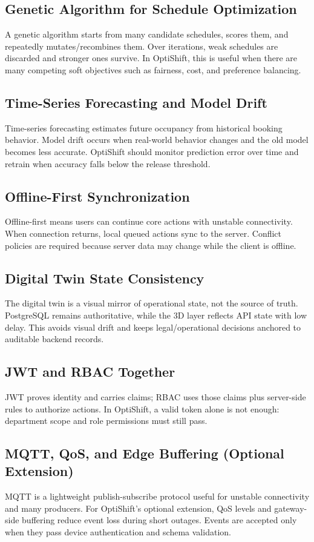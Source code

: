 \documentclass[11pt,a4paper]{article}
\begin{document}
\subsection{Genetic Algorithm for Schedule Optimization}
A genetic algorithm starts from many candidate schedules, scores them, and repeatedly mutates/recombines them.
Over iterations, weak schedules are discarded and stronger ones survive.
In OptiShift, this is useful when there are many competing soft objectives such as fairness, cost, and preference balancing.

\subsection{Time-Series Forecasting and Model Drift}
Time-series forecasting estimates future occupancy from historical booking behavior.
Model drift occurs when real-world behavior changes and the old model becomes less accurate.
OptiShift should monitor prediction error over time and retrain when accuracy falls below the release threshold.

\subsection{Offline-First Synchronization}
Offline-first means users can continue core actions with unstable connectivity.
When connection returns, local queued actions sync to the server.
Conflict policies are required because server data may change while the client is offline.

\subsection{Digital Twin State Consistency}
The digital twin is a visual mirror of operational state, not the source of truth.
PostgreSQL remains authoritative, while the 3D layer reflects API state with low delay.
This avoids visual drift and keeps legal/operational decisions anchored to auditable backend records.

\subsection{JWT and RBAC Together}
JWT proves identity and carries claims; RBAC uses those claims plus server-side rules to authorize actions.
In OptiShift, a valid token alone is not enough: department scope and role permissions must still pass.

\subsection{MQTT, QoS, and Edge Buffering (Optional Extension)}
MQTT is a lightweight publish-subscribe protocol useful for unstable connectivity and many producers.
For OptiShift's optional extension, QoS levels and gateway-side buffering reduce event loss during short outages.
Events are accepted only when they pass device authentication and schema validation.
\end{document}
